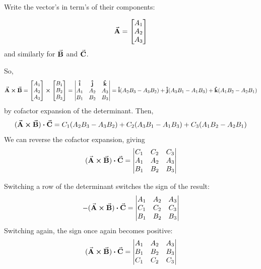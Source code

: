 \documentclass[a4paper]{article}
\begin{document}
Write the vector's in term's of their components:

$$ \va{A} = \begin{bmatrix}
    A_1 \\
    A_2 \\
    A_3 \\
\end{bmatrix} $$
and similarly for $\va{B}$ and $\va{C}$.

So,
$$ \va{A} \cross \va{B} = \begin{bmatrix}
    A_1 \\
    A_2 \\
    A_3 \\
\end{bmatrix} \cross
\begin{bmatrix}
    B_1 \\
    B_2 \\
    B_3 \\
\end{bmatrix} = \begin{vmatrix}
    \vu{i} & \vu{j} & \vu{k} \\
    A_1 & A_2 & A_3 \\
    B_1 & B_2 & B_3 \\
    \end{vmatrix} = \vu{i}(A_2 B_3 - A_3 B_2) + \vu{j}(A_3 B_1 - A_1 B_3) + \vu{k}(A_1 B_2 - A_2 B_1) $$
by cofactor expansion of the determinant.
Then, 
$$(\va{A} \cross \va{B}) \vdot \va{C} = C_1 (A_2 B_3 - A_3 B_2) + C_2 (A_3 B_1 - A_1 B_3) + C_3 (A_1 B_2 - A_2 B_1)$$
We can reverse the cofactor expansion, giving
$$ (\va{A} \cross \va{B}) \vdot \va{C} = 
    \begin{vmatrix}
    C_1 & C_2 & C_3 \\
    A_1 & A_2 & A_3 \\
    B_1 & B_2 & B_3 \\
    \end{vmatrix}$$

Switching a row of the determinant switches the sign of the result:
$$ -(\va{A} \cross \va{B}) \vdot \va{C} = 
    \begin{vmatrix}
    A_1 & A_2 & A_3 \\
    C_1 & C_2 & C_3 \\
    B_1 & B_2 & B_3 \\
    \end{vmatrix}$$
Switching again, the sign once again becomes positive:
$$ (\va{A} \cross \va{B}) \vdot \va{C} = 
    \begin{vmatrix}
    A_1 & A_2 & A_3 \\
    B_1 & B_2 & B_3 \\
    C_1 & C_2 & C_3 
    \end{vmatrix}  $$ \\\\
\end{document}
